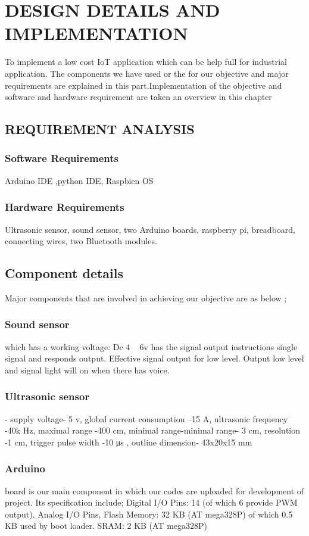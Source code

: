 \chapter{DESIGN DETAILS AND IMPLEMENTATION}
To implement a low cost IoT application which can be help full for industrial application. The components we have used or the for our objective and major requirements are explained in this part.Implementation of the objective and software and hardware requirement are taken an overview in this  chapter

\section{REQUIREMENT ANALYSIS}
\subsection {Software Requirements}
Arduino IDE ,python IDE, Raspbien OS 
 \subsection{Hardware Requirements}
Ultrasonic sensor, sound sensor, two Arduino boards, raspberry pi, breadboard, connecting wires, two Bluetooth modules.  



\section{Component details}
Major components that are involved in achieving our objective are as below ;
\subsection{Sound sensor }  which has a working voltage: Dc 4 ~ 6v has the signal output instructions single signal and responds output. Effective signal output for low level. Output low level and signal light will on when there has voice.
\subsection{Ultrasonic sensor} - supply voltage- 5 v, global current consumption –15 A, ultrasonic frequency -40k Hz, maximal range -400 cm, minimal range-minimal range- 3 cm, resolution -1 cm, trigger pulse width -10 μs , outline dimension- 43x20x15 mm
\subsection{Arduino}  board is our main component in which our codes are uploaded for development of project. Its specification include; Digital I/O Pins: 14 (of which 6 provide PWM output), Analog I/O Pins, Flash Memory: 32 KB (AT mega328P) of which 0.5 KB used by boot loader. SRAM: 2 KB (AT mega328P)
